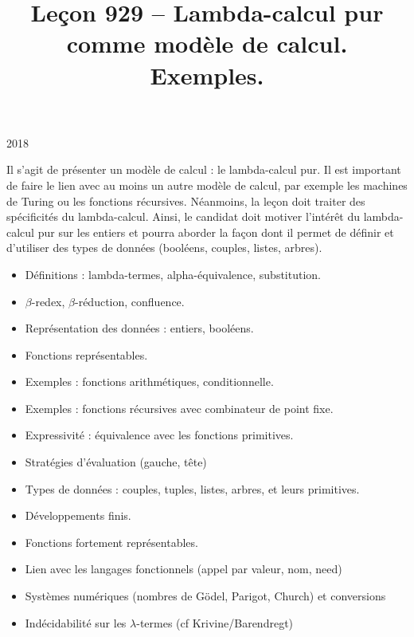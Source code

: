 \documentclass{agregfiche}
\title{Leçon 929 -- Lambda-calcul pur comme modèle de calcul. Exemples.}
\begin{document}
\maketitle

\secrapports

\begin{rapport}{2018}

Il s'agit de présenter un modèle de calcul : le lambda-calcul pur.
Il est important de faire le lien avec au moins un autre modèle de calcul, par exemple les machines de Turing ou les fonctions récursives.
Néanmoins, la leçon doit traiter des spécificités du lambda-calcul.
Ainsi, le candidat doit motiver l'intérêt du lambda-calcul pur sur les entiers et pourra aborder la façon dont il permet de définir et d'utiliser des types de données (booléens, couples, listes, arbres).

\end{rapport}

\secindispensables

\begin{itemize}
    \item Définitions : lambda-termes, alpha-équivalence, substitution.
    \item $\beta$-redex, $\beta$-réduction, confluence.
\end{itemize}

\secasavoir

\begin{itemize}
	\item Représentation des données : entiers, booléens.
	\item Fonctions représentables.
	\item Exemples : fonctions arithmétiques, conditionnelle.
	\item Exemples : fonctions récursives avec combinateur de point fixe.
	\item Expressivité : équivalence avec les fonctions primitives.
	\item Stratégies d'évaluation (gauche, tête)
\end{itemize}

\secidees

\begin{itemize}
	\item Types de données : couples, tuples, listes, arbres, et leurs primitives.
	\item Développements finis.
	\item Fonctions fortement représentables.
	\item Lien avec les langages fonctionnels (appel par valeur, nom, need)
	\item Systèmes numériques (nombres de Gödel, Parigot, Church) et conversions
	\item Indécidabilité sur les $\lambda$-termes (cf Krivine/Barendregt)
\end{itemize}
\end{document}
